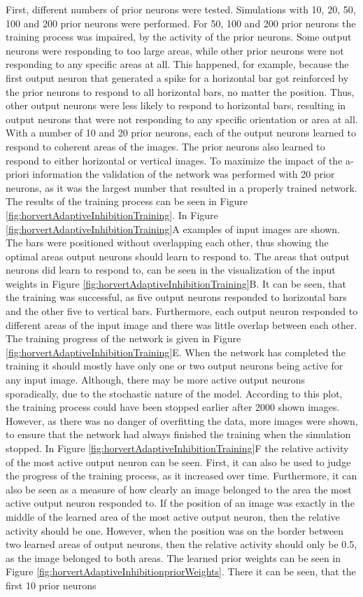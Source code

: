 First, different numbers of prior neurons were tested. Simulations with 10, 20, 50, 100 and 200 prior neurons were performed. For 50, 100 and 200 prior neurons the training process was impaired, by the activity of the prior neurons. Some output neurons were responding to too large areas, while other prior neurons were not responding to any specific areas at all. This happened, for example, because the first output neuron that generated a spike for a horizontal bar got reinforced by the prior neurons to respond to all horizontal bars, no matter the position. Thus, other output neurons were less likely to respond to horizontal bars, resulting in output neurons that were not responding to any specific orientation or area at all. With a number of 10 and 20 prior neurons, each of the output neurons learned to respond to coherent areas of the images. The prior neurons also learned to respond to either horizontal or vertical images. To maximize the impact of the a-priori information the validation of the network was performed with 20 prior neurons, as it was the largest number that resulted in a properly trained network. The results of the training process can be seen in Figure \ref{fig:horvertAdaptiveInhibitionTraining}. In Figure \ref{fig:horvertAdaptiveInhibitionTraining}A examples of input images are shown. The bars were positioned without overlapping each other, thus showing the optimal areas output neurons should learn to respond to. The areas that output neurons did learn to respond to, can be seen in the visualization of the input weights in Figure \ref{fig:horvertAdaptiveInhibitionTraining}B. It can be seen, that the training was successful, as five output neurons responded to horizontal bars and the other five to vertical bars. Furthermore, each output neuron responded to different areas of the input image and there was little overlap between each other. The training progress of the network is given in Figure \ref{fig:horvertAdaptiveInhibitionTraining}E. When the network has completed the training it should mostly have only one or two output neurons being active for any input image. Although, there may be more active output neurons sporadically, due to the stochastic nature of the model. According to this plot, the training process could have been stopped earlier after 2000 shown images. However, as there was no danger of overfitting the data, more images were shown, to ensure that the network had always finished the training when the simulation stopped. In Figure \ref{fig:horvertAdaptiveInhibitionTraining}F the relative activity of the most active output neuron can be seen. First, it can also be used to judge the progress of the training process, as it increased over time. Furthermore, it can also be seen as a measure of how clearly an image belonged to the area the most active output neuron responded to. If the position of an image was exactly in the middle of the learned area of the most active output neuron, then the relative activity should be one. However, when the position was on the border between two learned areas of output neurons, then the relative activity should only be 0.5, as the image belonged to both areas. The learned prior weights can be seen in Figure \ref{fig:horvertAdaptiveInhibitionpriorWeights}. There it can be seen, that the first 10 prior neurons 